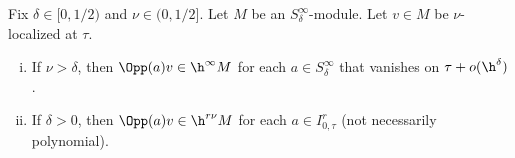 \begin{theorem}\label{thm:S-infinity-modules-localized-stuff}
  Fix $\delta \in [0,1/2)$ and $\nu \in (0,1/2]$.  Let $M$ be an $S^\infty_\delta$-module.  Let $v \in M$ be $\nu$-localized at $\tau$.
  \begin{enumerate}[(i)]
  \item \label{item:1-thm:S-infinity-modules-localized-stuff} If $\nu > \delta$, then $\Opp(a) v \in \h^\infty M$ for each $a \in S^\infty_\delta$ that vanishes on $\tau + o(\h^\delta)$.
  \item \label{item:2-thm:S-infinity-modules-localized-stuff} If $\delta > 0$, then $\Opp(a) v \in \h^{r \nu} M$ for each $a \in I_{0,\tau}^r$ (not necessarily polynomial).
  \end{enumerate}
\end{theorem}
